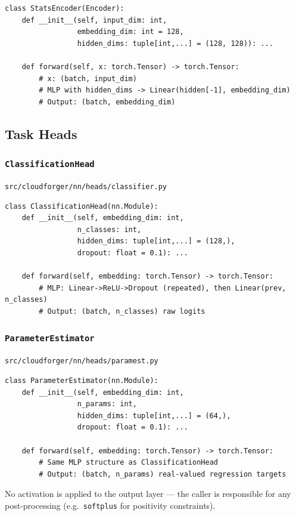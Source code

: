 \documentclass[11pt, a4paper]{article}
\newcommand{\code}[1]{\texttt{#1}}
\newcommand{\pyfile}[1]{\texttt{\small #1}}
\newcommand{\typename}[1]{\textbf{\texttt{#1}}}
\begin{document}
\begin{lstlisting}
class StatsEncoder(Encoder):
    def __init__(self, input_dim: int,
                 embedding_dim: int = 128,
                 hidden_dims: tuple[int,...] = (128, 128)): ...

    def forward(self, x: torch.Tensor) -> torch.Tensor:
        # x: (batch, input_dim)
        # MLP with hidden_dims -> Linear(hidden[-1], embedding_dim)
        # Output: (batch, embedding_dim)
\end{lstlisting}

\subsection{Task Heads}

\subsubsection{\typename{ClassificationHead}}
\pyfile{src/cloudforger/nn/heads/classifier.py}

\begin{lstlisting}
class ClassificationHead(nn.Module):
    def __init__(self, embedding_dim: int,
                 n_classes: int,
                 hidden_dims: tuple[int,...] = (128,),
                 dropout: float = 0.1): ...

    def forward(self, embedding: torch.Tensor) -> torch.Tensor:
        # MLP: Linear->ReLU->Dropout (repeated), then Linear(prev, n_classes)
        # Output: (batch, n_classes) raw logits
\end{lstlisting}

\subsubsection{\typename{ParameterEstimator}}
\pyfile{src/cloudforger/nn/heads/paramest.py}

\begin{lstlisting}
class ParameterEstimator(nn.Module):
    def __init__(self, embedding_dim: int,
                 n_params: int,
                 hidden_dims: tuple[int,...] = (64,),
                 dropout: float = 0.1): ...

    def forward(self, embedding: torch.Tensor) -> torch.Tensor:
        # Same MLP structure as ClassificationHead
        # Output: (batch, n_params) real-valued regression targets
\end{lstlisting}

No activation is applied to the output layer --- the caller is
responsible for any post-processing (e.g.\ \code{softplus} for
positivity constraints).
\end{document}
